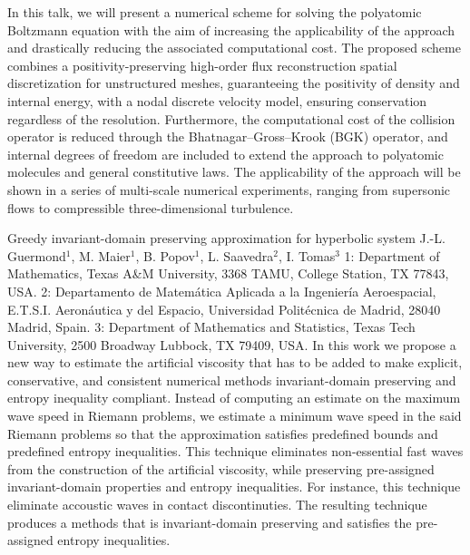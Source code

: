 \begin{addmargin}[2em]{0em}
{	In this talk, we will present a numerical scheme for solving the polyatomic Boltzmann equation with the aim of increasing the applicability of the approach and drastically reducing the associated computational cost. The proposed scheme combines a positivity-preserving high-order flux reconstruction spatial discretization for unstructured meshes, guaranteeing the positivity of density and internal energy, with a nodal discrete velocity model, ensuring conservation regardless of the resolution. Furthermore, the computational cost of the collision operator is reduced through the Bhatnagar–Gross–Krook (BGK) operator, and internal degrees of freedom are included to extend the approach to polyatomic molecules and general constitutive laws. The applicability of the approach will be shown in a series of multi-scale numerical experiments, ranging from supersonic flows to compressible three-dimensional turbulence.}


\vspace{1.5ex}
\abs
{Greedy invariant-domain preserving approximation for hyperbolic system}
{J.-L. Guermond$^1$, M. Maier$^1$, B. Popov$^1$, L. Saavedra$^2$, I. Tomas$^3$}
{1: Department of Mathematics, Texas A\&M University, 3368
	TAMU, College Station, TX 77843, USA.
	2: Departamento de Matem\'atica Aplicada a la Ingenier\'ia
	Aeroespacial, E.T.S.I. Aeron\'autica y del Espacio, Universidad
	Polit\'ecnica de Madrid, 28040 Madrid, Spain.
	3: Department of Mathematics and Statistics,
	Texas Tech University, 2500 Broadway Lubbock,
	TX 79409, USA.}
{In this work we propose a new way to estimate the artificial viscosity
	that has to be added to make explicit, conservative, and consistent
	numerical methods invariant-domain preserving and entropy inequality
	compliant. Instead of computing an estimate on the maximum wave speed
	in Riemann problems, we estimate a minimum wave speed in the said
	Riemann problems so that the approximation satisfies predefined bounds
	and predefined entropy inequalities. This technique eliminates
	non-essential fast waves from the construction of the artificial
	viscosity, while preserving pre-assigned invariant-domain properties
	and entropy inequalities. For instance, this technique eliminate
	accoustic waves in contact discontinuties. The resulting technique
	produces a methods that is invariant-domain preserving and satisfies
	the pre-assigned entropy inequalities.}



\end{addmargin}
